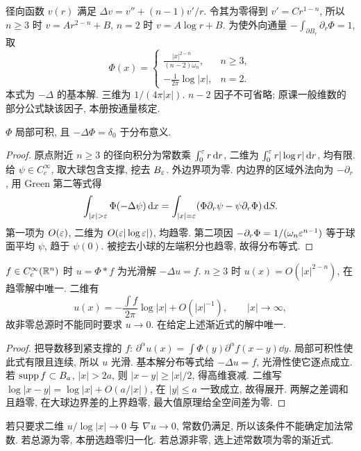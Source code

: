 \label{ch:fundamental}
径向函数 $v(r)$ 满足 $\Delta v=v''+(n-1)v'/r$. 令其为零得到 $v'=Cr^{1-n}$, 所以 $n\ge3$ 时 $v=Ar^{2-n}+B$, $n=2$ 时 $v=A\log r+B$. 为使外向通量 $-\int_{\partial B_r}\partial_r\Phi=1$, 取
\begin{equation}\label{eq:newtonkernel}
\Phi(x)=\begin{cases}
\displaystyle\frac{|x|^{2-n}}{(n-2)\omega_n},&n\ge3,\\[3pt]
\displaystyle-\frac1{2\pi}\log|x|,&n=2.
\end{cases}
\end{equation}
本式为 $-\Delta$ 的基本解. 三维为 $1/(4\pi|x|)$. $n-2$ 因子不可省略; 原课一般维数的部分公式缺该因子, 本册按通量核定.
\begin{theorem}\label{thm:fundsolution}
$\Phi$ 局部可积, 且 $-\Delta\Phi=\delta_0$ 于分布意义.
\end{theorem}
\begin{proof}
原点附近 $n\ge3$ 的径向积分为常数乘 $\int_0^\varepsilon r\,\mathrm d r$, 二维为 $\int_0^\varepsilon r|\log r|\,\mathrm d r$, 均有限. 给 $\psi\in C_c^\infty$, 取大球包含支撑, 挖去 $B_\varepsilon$. 外边界项为零. 内边界的区域外法向为 $-\partial_r$, 用 Green 第二等式得
\[
\int_{|x|>\eps}\Phi(-\Delta\psi)\dd x
=\int_{|x|=\eps}(\Phi\partial_r\psi-\psi\partial_r\Phi)\dd S.
\]
第一项为 $O(\varepsilon)$, 二维为 $O(\varepsilon|\log\varepsilon|)$, 均趋零. 第二项因 $-\partial_r\Phi=1/(\omega_n\varepsilon^{n-1})$ 等于球面平均 $\psi$, 趋于 $\psi(0)$. 被挖去小球的左端积分也趋零, 故得分布等式.
\end{proof}
\begin{theorem}\label{thm:newtonpotential}
$f\in C_c^\infty(\mathbb R^n)$ 时 $u=\Phi*f$ 为光滑解 $-\Delta u=f$. $n\ge3$ 时 $u(x)=O(|x|^{2-n})$, 在趋零解中唯一. 二维有
\[
u(x)=-\frac{\int f}{2\pi}\log|x|+O(|x|^{-1}),\qquad |x|\to\infty,
\]
故非零总源时不能同时要求 $u\to0$. 在给定上述渐近式的解中唯一.
\end{theorem}
\begin{proof}
把导数移到紧支撑的 $f$: $\partial^\alpha u(x)=\int\Phi(y)\partial^\alpha f(x-y)\dd y$. 局部可积性使此式有限且连续, 所以 $u$ 光滑. 基本解分布等式给 $-\Delta u=f$, 光滑性使它逐点成立. 若 $\operatorname{supp} f\subset B_a$, $|x|>2a$, 则 $|x-y|\ge|x|/2$, 得高维衰减. 二维写 $\log|x-y|=\log|x|+O(a/|x|)$, 在 $|y|\le a$ 一致成立, 故得展开. 两解之差调和且趋零, 在大球边界差的上界趋零, 最大值原理给全空间差为零.
\end{proof}
若只要求二维 $u/\log|x|\to0$ 与 $\nabla u\to0$, 常数仍满足, 所以该条件不能确定加法常数. 若总源为零, 本册选趋零归一化. 若总源非零, 选上述常数项为零的渐近式.
